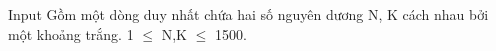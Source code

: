 Input
Gồm một dòng duy nhất chứa hai số nguyên dương N, K cách nhau bởi một khoảng trắng. 1 $\le$ N,K $\le$ 1500.